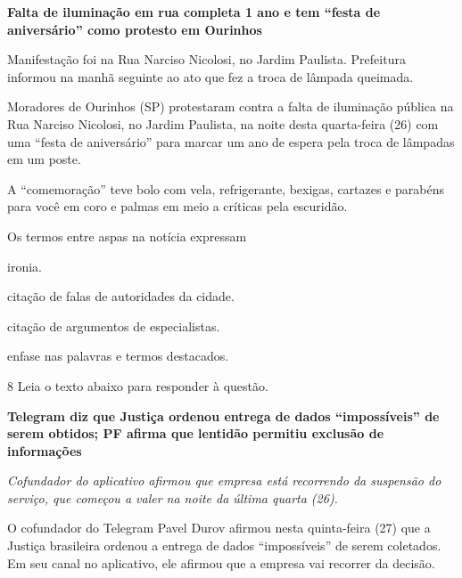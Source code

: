 \begin{myquote}

\textbf{Falta de iluminação em rua completa 1 ano e tem ``festa de
aniversário'' como protesto em Ourinhos}

Manifestação foi na Rua Narciso Nicolosi, no Jardim Paulista. Prefeitura
informou na manhã seguinte ao ato que fez a troca de lâmpada queimada.

Moradores de Ourinhos (SP) protestaram contra a falta de iluminação
pública na Rua Narciso Nicolosi, no Jardim Paulista, na noite desta
quarta-feira (26) com uma ``festa de aniversário'' para marcar um ano de
espera pela troca de lâmpadas em um poste.

A ``comemoração'' teve bolo com vela, refrigerante, bexigas, cartazes e
parabéns para você em coro e palmas em meio a críticas pela escuridão.

\end{myquote}


Os termos entre aspas na notícia expressam

\begin{escolha}
    
    \item ironia. 
    
    \item citação de falas de autoridades da cidade.
    
    \item citação de argumentos de especialistas.
    
    \item enfase nas palavras e termos destacados.

\end{escolha}

\num{8} Leia o texto abaixo para responder à questão. 

\begin{myquote}

\textbf{Telegram diz que Justiça ordenou entrega de dados ``impossíveis''
de serem obtidos; PF afirma que lentidão permitiu exclusão de
informações}

\textit{Cofundador do aplicativo afirmou que empresa está recorrendo da
suspensão do serviço, que começou a valer na noite da última quarta
(26).}

O cofundador do Telegram Pavel Durov afirmou nesta quinta-feira (27) que
a Justiça brasileira ordenou a entrega de dados ``impossíveis'' de serem
coletados. Em seu canal no aplicativo, ele afirmou que a empresa vai
recorrer da decisão.

\end{myquote}

